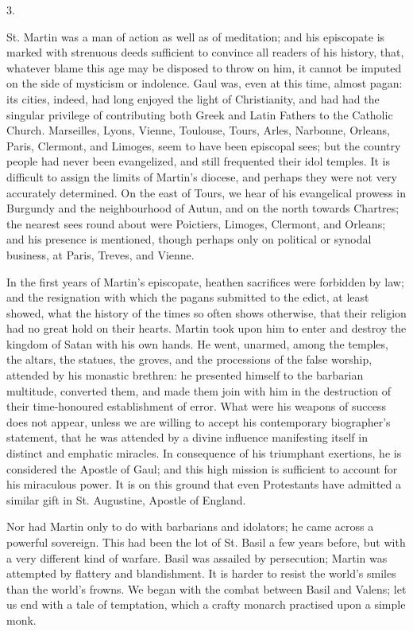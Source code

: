 3.

St. Martin was a man of action as well as of meditation; and his
episcopate is marked with strenuous deeds sufficient to convince all
readers of his history, that, whatever blame this age may be disposed
to throw on him, it cannot be imputed on the side of mysticism or
indolence. Gaul was, even at this time, almost pagan: its cities,
indeed, had long enjoyed the light of Christianity, and had had the
singular privilege of contributing both Greek and Latin Fathers to the
Catholic Church. Marseilles, Lyons, Vienne, Toulouse, Tours, Arles,
Narbonne, Orleans, Paris, Clermont, and Limoges, seem to have been
episcopal sees; but the country people had never been evangelized, and
still frequented their idol temples. It is difficult to assign the
limits of Martin's diocese, and perhaps they were not very accurately
determined. On the east of Tours, we hear of his evangelical prowess
in Burgundy and the neighbourhood of Autun, and on the north towards
Chartres; the nearest sees round about were Poictiers, Limoges,
Clermont, and Orleans; and his presence is mentioned, though perhaps
only on political or synodal business, at Paris, Treves, and Vienne.

In the first years of Martin's episcopate, heathen sacrifices
were forbidden by law; and the resignation with which the pagans
submitted to the edict, at least showed, what the history of the times
so often shows otherwise, that their religion had no great hold on
their hearts. Martin took upon him to enter and destroy the kingdom of
Satan with his own hands. He went, unarmed, among the temples, the
altars, the statues, the groves, and the processions of the false
worship, attended by his monastic brethren: he presented himself to
the barbarian multitude, converted them, and made them join with him
in the destruction of their time-honoured establishment of error. What
were his weapons of success does not appear, unless we are willing to
accept his contemporary biographer's statement, that he was attended
by a divine influence manifesting itself in distinct and emphatic
miracles. In consequence of his triumphant exertions, he is considered
the Apostle of Gaul; and this high mission is sufficient to account
for his miraculous power. It is on this ground that even Protestants
have admitted a similar gift in St. Augustine, Apostle of England.

Nor had Martin only to do with barbarians and idolators; he came
across a powerful sovereign. This had been the lot of St. Basil a few
years before, but with a very different kind of warfare. Basil was
assailed by persecution; Martin was attempted by flattery and
blandishment. It is harder to resist the world's smiles than the world's
frowns. We began with the combat between Basil and Valens; let us end
with a tale of temptation, which a crafty monarch practised upon a
simple monk.

